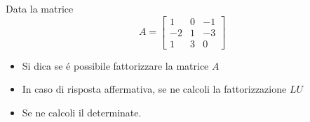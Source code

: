 Data la matrice
\bigskip
\[
A=\left[
\begin{array}{ccc}
1 & 0 & -1 \\
-2 & 1 & -3\\
1 & 3 & 0
\end{array}\right]
\]


\begin{itemize}
\item Si dica se \'e possibile fattorizzare la matrice $A$
\item In caso di risposta affermativa, se ne calcoli la fattorizzazione $LU$

\item Se ne calcoli il determinate.
\end{itemize}
